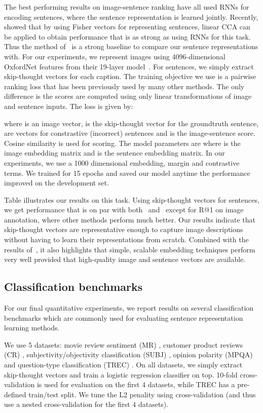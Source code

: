 \documentclass{article} \usepackage{nips15submit_e,times}
\begin{document}
The best performing results on image-sentence ranking have all used RNNs for encoding sentences, where the sentence representation is learned jointly. Recently,  showed that by using Fisher vectors for representing sentences, linear CCA can be applied to obtain performance that is as strong as using RNNs for this task. Thus the method of~\cite{klein2015associating} is a strong baseline to compare our sentence representations with. For our experiments, we represent images using 4096-dimensional OxfordNet features from their 19-layer model~\cite{simonyan2014very}. For sentences, we simply extract skip-thought vectors for each caption. The training objective we use is a pairwise ranking loss that has been previously used by many other methods. The only difference is the scores are computed using only linear transformations of image and sentence inputs. The loss is given by:

where  is an image vector,  is the skip-thought vector for the groundtruth sentence,  are vectors for constrastive (incorrect) sentences and  is the image-sentence score. Cosine similarity is used for scoring. The model parameters are  where  is the image embedding matrix and  is the sentence embedding matrix. In our experiments, we use a 1000 dimensional embedding, margin  and  contrastive terms. We trained for 15 epochs and saved our model anytime the performance improved on the development set.

Table illustrates our results on this task. Using skip-thought vectors for sentences, we get performance that is on par with both~\cite{Karpathy15} and~\cite{klein2015associating} except for R@1 on image annotation, where other methods perform much better. Our results indicate that skip-thought vectors are representative enough to capture image descriptions without having to learn their representations from scratch. Combined with the results of~\cite{klein2015associating}, it also highlights that simple, scalable embedding techniques perform very well provided that high-quality image and sentence vectors are available.


\subsection{Classification benchmarks}


For our final quantitative experiments, we report results on several classification benchmarks which are commonly used for evaluating sentence representation learning methods. 

We use 5 datasets: movie review sentiment (MR) \cite{pang2005seeing}, customer product reviews (CR) \cite{hu2004mining}, subjectivity/objectivity  classification (SUBJ) \cite{pang2004sentimental}, opinion polarity (MPQA) \cite{wiebe2005annotating} and question-type classification (TREC) \cite{li2002learning}. On all datasets, we simply extract skip-thought vectors and train a logistic regression classifier on top. 10-fold cross-validation is used for evaluation on the first 4 datasets, while TREC has a pre-defined train/test split. We tune the L2 penality using cross-validation (and thus use a nested cross-validation for the first 4 datasets). 
\end{document}
